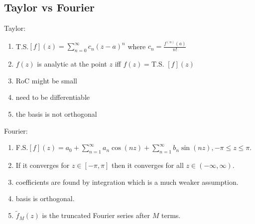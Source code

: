 \documentclass[class=article,crop=false]{standalone}
\begin{document}
\subsection{Taylor vs Fourier}
Taylor:
\begin{enumerate}[label=\arabic*)]
	\item T.S.$[f](z) = \sum_{ n=0}^{\infty} c_n(z-a)^{n}$ where $c_n=\frac{f^{(n)}(a)}{n!}$
	\item $f(z)$ is analytic at the point  $z$ iff $f(z)=$T.S. $[f](z)$
	\item RoC might be small
	\item need to be differentiable
	\item the basis is not orthogonal
\end{enumerate}
Fourier:
\begin{enumerate}[label=\arabic*)]
	\item F.S.$[f](z) = a_0 + \sum_{ n=1}^{\infty} a_n \cos(nz) + \sum_{ n=1}^{\infty} b_n \sin(nz ), -\pi\leq z \leq \pi$.
	\item If it converges for $z \in [-\pi,\pi]$ then it converges for all $z \in (-\infty,\infty)$.
	\item coefficients are found by integration which is a much weaker assumption.
	\item basis is orthogonal.
	\item $\tilde{f}_M(z)$ is the truncated Fourier series after $M$ terms.
\end{enumerate}
\end{document}
